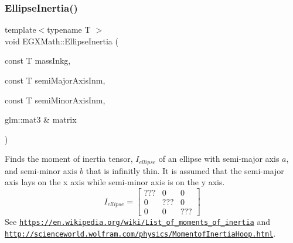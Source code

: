 \mbox{\label{group___e_g_x_math-_geometry-2_d-_ellipse-_inertia_gad679a65dc7550e27dc69c1d328c94732}} 
\subsubsection{\texorpdfstring{Ellipse\+Inertia()}{EllipseInertia()}\hspace{0.1cm}{\footnotesize\ttfamily [3/3]}}
{\footnotesize\ttfamily template$<$typename T $>$ \\
void E\+G\+X\+Math\+::\+Ellipse\+Inertia (\begin{DoxyParamCaption}\item[{const T}]{mass\+Inkg,  }\item[{const T}]{semi\+Major\+Axis\+Inm,  }\item[{const T}]{semi\+Minor\+Axis\+Inm,  }\item[{glm\+::mat3 \&}]{matrix }\end{DoxyParamCaption})}



Finds the moment of inertia tensor, $I_{ellipse}$ of an ellipse with semi-\/major axis $a$, and semi-\/minor axis $b$ that is infinitly thin. It is assumed that the semi-\/major axis lays on the x axis while semi-\/minor axis is on the y axis. \[ I_{ellipse}=\begin{bmatrix} ??? & 0 & 0\\ 0 & ??? & 0\\ 0 & 0 & ??? \end{bmatrix} \] See \href{https://en.wikipedia.org/wiki/List_of_moments_of_inertia}{\tt https\+://en.\+wikipedia.\+org/wiki/\+List\+\_\+of\+\_\+moments\+\_\+of\+\_\+inertia} and \href{http://scienceworld.wolfram.com/physics/MomentofInertiaHoop.html}{\tt http\+://scienceworld.\+wolfram.\+com/physics/\+Momentof\+Inertia\+Hoop.\+html}. 


